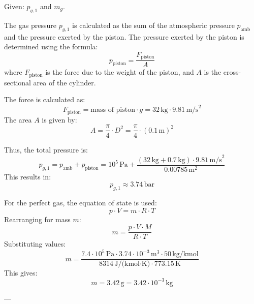 Given: \( p_{g,1} \) and \( m_g \).  

The gas pressure \( p_{g,1} \) is calculated as the sum of the atmospheric pressure \( p_{\text{amb}} \) and the pressure exerted by the piston. The pressure exerted by the piston is determined using the formula:  
\[
p_{\text{piston}} = \frac{F_{\text{piston}}}{A}
\]  
where \( F_{\text{piston}} \) is the force due to the weight of the piston, and \( A \) is the cross-sectional area of the cylinder.  

The force is calculated as:  
\[
F_{\text{piston}} = \text{mass of piston} \cdot g = 32 \, \text{kg} \cdot 9.81 \, \text{m/s}^2
\]  
The area \( A \) is given by:  
\[
A = \frac{\pi}{4} \cdot D^2 = \frac{\pi}{4} \cdot (0.1 \, \text{m})^2
\]  

Thus, the total pressure is:  
\[
p_{g,1} = p_{\text{amb}} + p_{\text{piston}} = 10^5 \, \text{Pa} + \frac{(32 \, \text{kg} + 0.7 \, \text{kg}) \cdot 9.81 \, \text{m/s}^2}{0.00785 \, \text{m}^2}
\]  
This results in:  
\[
p_{g,1} \approx 3.74 \, \text{bar}
\]  

For the perfect gas, the equation of state is used:  
\[
p \cdot V = m \cdot R \cdot T
\]  
Rearranging for mass \( m \):  
\[
m = \frac{p \cdot V \cdot M}{R \cdot T}
\]  
Substituting values:  
\[
m = \frac{7.4 \cdot 10^5 \, \text{Pa} \cdot 3.74 \cdot 10^{-3} \, \text{m}^3 \cdot 50 \, \text{kg/kmol}}{8314 \, \text{J/(kmol·K)} \cdot 773.15 \, \text{K}}
\]  
This gives:  
\[
m = 3.42 \, \text{g} = 3.42 \cdot 10^{-3} \, \text{kg}
\]  

---